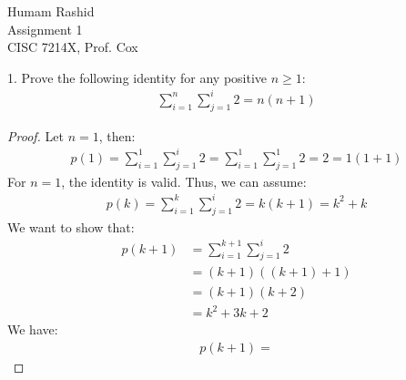 \documentclass{scrartcl}
\begin{document}
\begin{flushleft}

    Humam Rashid\\
    Assignment 1\\
    CISC 7214X, Prof. Cox\\
    \bigskip
    
    1. Prove the following identity for any positive $n \geq 1$:
    \begin{align*}
        \sum_{i=1}^{n}\sum_{j=1}^{i} 2 = n (n + 1)
    \end{align*}

    \begin{proof}
        Let $n = 1$, then:
        \begin{align}
            p(1) = \sum_{i=1}^{1}\sum_{j=1}^{i} 2 = \sum_{i=1}^{1}\sum_{j=1}^{1} 2 = 2 = 1 (1 + 1)
        \end{align}
        For $n = 1$, the identity is valid. Thus, we can assume:
        \begin{align}
            p(k) = \sum_{i=1}^{k}\sum_{j=1}^{i} 2 = k (k + 1) = k^2 + k
        \end{align}
        We want to show that:
        \begin{align}
            p(k + 1) &= \sum_{i=1}^{k + 1}\sum_{j=1}^{i} 2 \\
                     &= (k + 1) ((k + 1) + 1) \\
                     &= (k + 1) (k + 2) \\
                     &= k^2 + 3k + 2
        \end{align}
        We have:
        \begin{align}
            p(k + 1) = 
        \end{align}
    \end{proof}

\end{flushleft}
\end{document}
